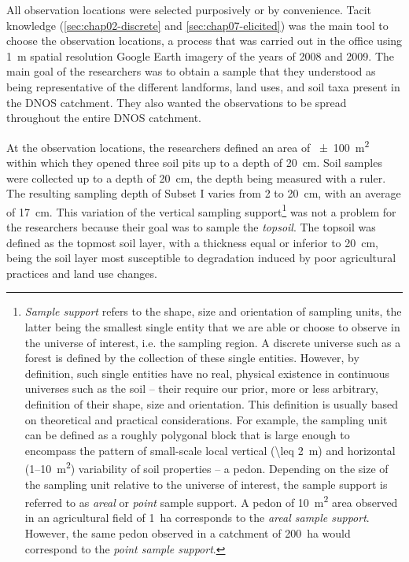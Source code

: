 All observation locations were selected purposively or by convenience. Tacit knowledge 
(\autoref{sec:chap02-discrete} and \autoref{sec:chap07-elicited}) was the main tool to choose the observation 
locations, a process that was carried out in the office using \SI{1}{\metre} spatial resolution Google 
Earth\rr{} imagery of the years of \num{2008} and \num{2009}. The main goal of the researchers was to obtain a 
sample that they understood as being representative of the different landforms, land uses, and soil taxa 
present in the DNOS catchment. They also wanted the observations to be spread throughout the entire DNOS 
catchment.

\def\footsupport{\footnote{\emph{Sample support} refers to the shape, size and orientation of sampling units, 
the latter being the smallest single entity that we are able or choose to observe in the universe of interest, 
i.e. the sampling region. A discrete universe such as a forest is defined by the collection of these single 
entities. However, by definition, such single entities have no real, physical existence in continuous 
universes such as the soil -- their \q{existence} require our prior, more or less arbitrary, definition of 
their shape, size and orientation. This definition is usually based on theoretical and practical 
considerations. For example, the sampling unit can be defined as a roughly polygonal block that is large 
enough to encompass the pattern of small-scale local vertical (\SI{\leq2}{\m}) and horizontal 
(1--\SI{10}{\square\metre}) variability of soil properties -- a pedon. Depending on the size of the sampling 
unit relative to the universe of interest, the sample support is referred to as \emph{areal} or \emph{point} 
sample support. A pedon of \SI{10}{\square\metre} area observed in an agricultural field of \SI{1}{\hectare} 
corresponds to the \emph{areal sample support}. However, the same pedon observed in a catchment of 
\SI{200}{\hectare} would correspond to the \emph{point sample support}.}}

At the observation locations, the researchers defined an area of \SI{\pm100}{\metre\squared} within which they 
opened three soil pits up to a depth of \SI{20}{\centi\metre}. Soil samples were collected up to a depth of 
\SI{20}{\centi\metre}, the depth being measured with a ruler. The resulting sampling depth of Subset I varies 
from \num{2} to \SI{20}{\centi\metre}, with an average of \SI{17}{\centi\metre}. This variation of the 
vertical sampling support\footsupport{} was not a problem for the researchers because their goal was to sample 
the \emph{topsoil}. The topsoil was defined as the topmost soil layer, with a thickness equal or inferior to 
\SI{20}{\centi\metre}, being the soil layer most susceptible to degradation induced by poor agricultural 
practices and land use changes.

